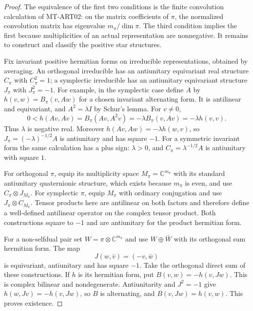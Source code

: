 \begin{proof}
The equivalence of the first two conditions is the finite
convolution calculation of MT-ART02: on the matrix coefficients
of $\pi$, the normalized convolution matrix has eigenvalue
$m_\pi/\dim\pi$.  The third condition implies the first because
multiplicities of an actual representation are nonnegative.
It remains to construct and classify the positive star structures.

Fix invariant positive hermitian forms on irreducible
representations, obtained by averaging.  An orthogonal irreducible
has an antiunitary equivariant real structure $C_\pi$ with
$C_\pi^2=1$; a symplectic irreducible has an antiunitary
equivariant structure $J_\pi$ with $J_\pi^2=-1$.
For example, in the symplectic case define $A$ by
$h(v,w)=B_\pi(v,Aw)$ for a chosen invariant alternating form.
It is antilinear and equivariant, and $A^2=\lambda I$ by
Schur's lemma.  For $v\ne0$,
\[
 0<h(Av,Av)=B_\pi(Av,A^2v)
             =-\lambda B_\pi(v,Av)=-\lambda h(v,v).
\]
Thus $\lambda$ is negative real.  Moreover
$h(Av,Aw)=-\lambda h(w,v)$, so
$J_\pi=(-\lambda)^{-1/2}A$ is antiunitary and has square
$-1$.  For a symmetric invariant form the same calculation
has a plus sign: $\lambda>0$, and
$C_\pi=\lambda^{-1/2}A$ is antiunitary with square $1$.

For orthogonal $\pi$, equip its multiplicity space
$M_\pi=\mathbb C^{m_\pi}$ with its standard antiunitary
quaternionic structure, which exists because $m_\pi$ is even,
and use $C_\pi\otimes J_{M_\pi}$.  For symplectic $\pi$,
equip $M_\pi$ with ordinary conjugation and use
$J_\pi\otimes C_{M_\pi}$.  Tensor products here are antilinear
on both factors and therefore define a well-defined antilinear
operator on the complex tensor product.  Both constructions
square to $-1$ and are antiunitary for the product hermitian form.

For a non-selfdual pair set $W=\pi\otimes\mathbb C^{m_\pi}$
and use $W\oplus\bar W$ with its orthogonal sum hermitian form.
The map
\[
             J(w,\bar v)=(-v,\bar w)
\]
is equivariant, antiunitary and has square $-1$.
Take the orthogonal direct sum of these constructions.
If $h$ is its hermitian form, put
$B(v,w)=-h(v,Jw)$.  This is complex bilinear and nondegenerate.
Antiunitarity and $J^2=-1$ give
$h(w,Jv)=-h(v,Jw)$, so $B$ is alternating, and
$B(v,Jw)=h(v,w)$.  This proves existence.


\end{proof}
